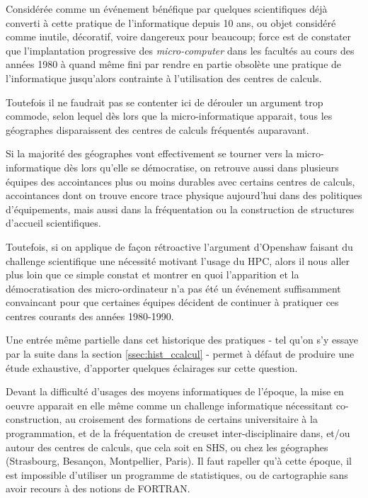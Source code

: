 Considérée comme un événement bénéfique par quelques scientifiques déjà converti à cette pratique de l'informatique depuis 10 ans, ou objet considéré comme inutile, décoratif, voire dangereux pour beaucoup; force est de constater que l'implantation progressive des \textit{micro-computer} dans les facultés au cours des années 1980 à quand même fini par rendre en partie obsolète une pratique de l’informatique jusqu'alors contrainte à l'utilisation des centres de calculs.

Toutefois il ne faudrait pas se contenter ici de dérouler un argument trop commode, selon lequel dès lors que la micro-informatique apparait, tous les géographes disparaissent des centres de calculs fréquentés auparavant.

Si la majorité des géographes vont effectivement se tourner vers la micro-informatique dès lors qu'elle se démocratise, on retrouve aussi dans plusieurs équipes des accointances plus ou moins durables avec certains centres de calculs, accointances dont on trouve encore trace physique aujourd'hui dans des politiques d'équipements, mais aussi dans la fréquentation ou la construction de structures d'accueil scientifiques.

Toutefois, si on applique de façon rétroactive l'argument d'Openshaw faisant du challenge scientifique une nécessité motivant l'usage du HPC, alors il nous aller plus loin que ce simple constat et montrer en quoi l'apparition et la démocratisation des micro-ordinateur n'a pas été un événement suffisamment convaincant pour que certaines équipes décident de continuer à pratiquer ces centres courants des années 1980-1990.

Une entrée même partielle dans cet historique des pratiques - tel qu'on s'y essaye par la suite dans la section \ref{ssec:hist_ccalcul} - permet à défaut de produire une étude exhaustive, d'apporter quelques éclairages sur cette question.

Devant la difficulté d'usages des moyens informatiques de l'époque, la mise en oeuvre apparait en elle même comme un challenge informatique nécessitant co-construction, au croisement des formations de certains universitaire à la programmation, et de la fréquentation de creuset inter-disciplinaire dans, et/ou autour des centres de calculs, que cela soit en SHS, ou chez les géographes (Strasbourg, Besançon, Montpellier, Paris). Il faut rapeller qu'à cette époque, il est impossible d'utiliser un programme de statistiques, ou de cartographie sans avoir recours à des notions de FORTRAN.

